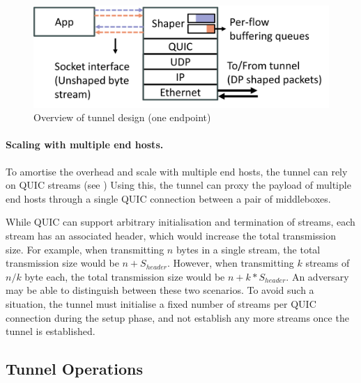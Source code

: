 \begin{figure}[!htb]
    \centering
    \includegraphics[width=\columnwidth]{figures/netshaper/tunnel-endpoint-design.png}
    \caption{Overview of tunnel design (one endpoint)}
    \label{fig:tunnel-endpoint-design}
\end{figure}

\paragraph{Scaling with multiple end hosts.}
To amortise the overhead and scale with multiple end hosts, the tunnel can rely on QUIC streams (see )
Using this, the tunnel can proxy the payload of multiple end hosts through a single QUIC connection between a pair of middleboxes.

While QUIC can support arbitrary initialisation and termination of streams, each stream has an associated header, which would increase the total transmission size.
For example, when transmitting $n$ bytes in a single stream, the total transmission size would be $n + S_{header}$.
However, when transmitting $k$ streams of $n/k$ byte each, the total transmission size would be $n + k*S_{header}$. 
An adversary may be able to distinguish between these two scenarios.
To avoid such a situation, the tunnel must initialise a fixed number of streams per QUIC connection during the setup phase, and not establish any more streams once the tunnel is established.


\subsection{Tunnel Operations}

